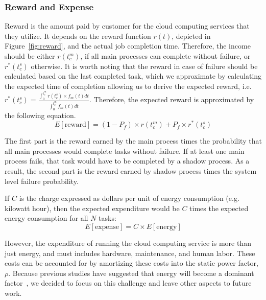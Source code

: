 \subsubsection{Reward and Expense}
Reward is the amount paid by customer for the cloud computing
services that they utilize. It depends on the reward function $r(t)$,
depicted in Figure~\ref{fig:reward}, and the actual job completion
time. Therefore, the income should be either $r(t_c^m)$, if all main
processes can complete without failure, or $r^*(t_c^s)$ otherwise. It
is worth noting that the reward in case of failure should be
calculated based on the last completed task, which we approximate by
calculating the expected time of completion allowing us to derive the
expected reward, i.e. $r^*(t_c^s)=\frac{\int_0^{t_c^m}r(t_c^s) \times
f_m(t)dt}{\int_0^{t_c^m}f_m(t)dt}$. Therefore, the expected reward is approximated by the following equation.
\begin{equation}
E[\text{reward}]= (1-P_f) \times r(t_c^m) + P_f \times r^*(t_c^s)
\end{equation}


The first part is the reward earned by the main process times the
probability that all main processes would complete tasks without
failure. If at least one main process fails, that task would have to
be completed by a shadow process. As a result, the second part is the
reward earned by shadow process times the system level failure probability.

If $C$ is the charge expressed as dollars per unit of energy consumption
(e.g. kilowatt hour), then the expected expenditure would be $C$ times
the expected energy consumption for all $N$ tasks:
\begin{equation}
E[\text{expense}] = C \times E[\text{energy}]
\label{eq:expense}
\end{equation}

However, the expenditure of running the cloud computing service is more
than just energy, and must includes hardware, maintenance, and human
labor. These costs can be accounted for by amortizing these costs into the
static power factor, $\rho$. Because previous studies have
suggested
that energy will become a dominant factor~\cite{elnozahy2003energy,raghavendra2008no}, we decided to focus on this
challenge and leave other aspects to future work.

